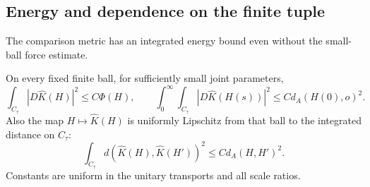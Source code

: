 \subsection{Energy and dependence on the finite tuple}
The comparison metric has an integrated energy bound even without
the small-ball force estimate.

\begin{lemma}\label{lem:reconstruction-energy}
On every fixed finite ball, for sufficiently small joint parameters,
\begin{equation}\label{eq:reconstruction-energy}
 \int_{C_\tau}|D\widehat K(H)|^2\le C\Phi(H),\qquad
 \int_0^\infty\!\int_{C_\tau}|D\widehat K(H(s))|^2
                     \le C d_A(H(0),o)^2.
\end{equation}
Also the map $H\mapsto\widehat K(H)$ is uniformly Lipschitz from
that ball to the integrated distance on $C_\tau$:
\begin{equation}\label{eq:reconstruction-lipschitz}
 \int_{C_\tau}d(\widehat K(H),\widehat K(H'))^2
                                      \le C d_A(H,H')^2.
\end{equation}
Constants are uniform in the unitary transports and all scale ratios.
\end{lemma}

